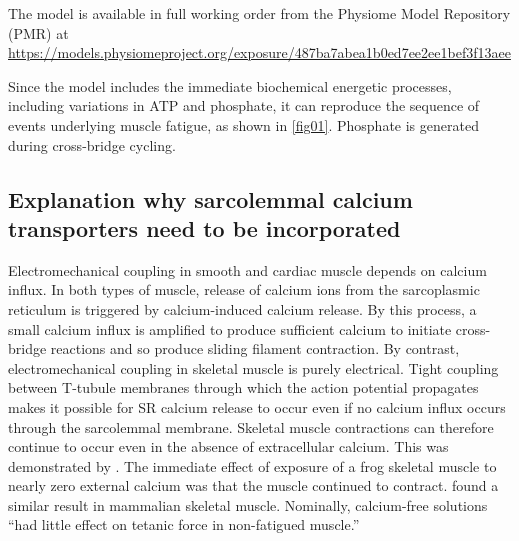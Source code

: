 \documentclass[fleqn,10pt]{physiome}
\begin{document}
The model is available in full working order from the Physiome Model Repository (PMR) at \url{https://models.physiomeproject.org/exposure/487ba7abea1b0ed7ee2ee1bef3f13aee}

Since the model includes the immediate biochemical energetic processes, including variations in ATP and phosphate, it can reproduce the sequence of events underlying muscle fatigue, as shown in \autoref{fig01}. Phosphate is generated during cross-bridge cycling.

\subsection{Explanation why sarcolemmal calcium transporters need to be incorporated}

Electromechanical coupling in smooth and cardiac muscle depends on calcium influx. In both types of muscle, release of calcium ions from the sarcoplasmic reticulum is triggered by calcium-induced calcium release. By this process, a small calcium influx is amplified to produce sufficient calcium to initiate cross-bridge reactions and so produce sliding filament contraction. By contrast, electromechanical coupling in skeletal muscle is purely electrical. Tight coupling between T-tubule membranes through which the action potential propagates makes it possible for SR calcium release to occur even if no calcium influx occurs through the sarcolemmal membrane. Skeletal muscle contractions can therefore continue to occur even in the absence of extracellular calcium. This was demonstrated by \citet{edman1964role}. The immediate effect of exposure of a frog skeletal muscle to nearly zero external calcium was that the muscle continued to contract. \citet{cairns1998role} found a similar result in mammalian skeletal muscle. Nominally, calcium-free solutions “had little effect on tetanic force in non-fatigued muscle.”
\end{document}
